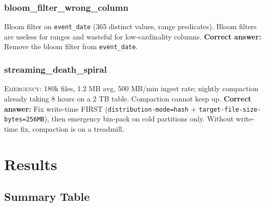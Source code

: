 \documentclass[11pt,a4paper]{article}
\newcommand{\code}[1]{\texttt{#1}}
\begin{document}
\subsubsection{bloom\_filter\_wrong\_column}
Bloom filter on \code{event\_date} (365 distinct values, range predicates).
Bloom filters are useless for ranges and wasteful for low-cardinality columns.
\textbf{Correct answer:} Remove the bloom filter from \code{event\_date}.

\subsubsection{streaming\_death\_spiral}
\textsc{Emergency}: 180k files, 1.2 MB avg, 500 MB/min ingest rate; nightly
compaction already taking 8 hours on a 2 TB table.  Compaction cannot keep up.
\textbf{Correct answer:} Fix write-time FIRST
(\code{distribution-mode=hash} + \code{target-file-size-bytes=256MB}), then
emergency bin-pack on cold partitions only.  Without write-time fix,
compaction is on a treadmill.

\section{Results}
\label{sec:results}

\subsection{Summary Table}
\end{document}
